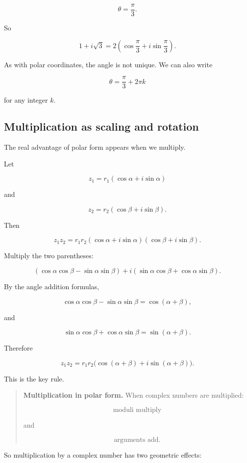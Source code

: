 \[
\theta=\frac{\pi}{3}.
\]

So

\[
\boxed{
1+i\sqrt3
=
2\left(\cos\frac{\pi}{3}+i\sin\frac{\pi}{3}\right).
}
\]

As with polar coordinates, the angle is not unique.  We can also write

\[
\theta=\frac{\pi}{3}+2\pi k
\]

for any integer \(k\).

\subsection{Multiplication as scaling and rotation}
\label{subsec:complex-multiplication-scaling-rotation}

The real advantage of polar form appears when we multiply.

Let

\[
z_1=r_1(\cos\alpha+i\sin\alpha)
\]

and

\[
z_2=r_2(\cos\beta+i\sin\beta).
\]

Then

\[
z_1z_2
=
r_1r_2(\cos\alpha+i\sin\alpha)(\cos\beta+i\sin\beta).
\]

Multiply the two parentheses:

\[
(\cos\alpha\cos\beta-\sin\alpha\sin\beta)
+
i(\sin\alpha\cos\beta+\cos\alpha\sin\beta).
\]

By the angle addition formulas,

\[
\cos\alpha\cos\beta-\sin\alpha\sin\beta=\cos(\alpha+\beta),
\]

and

\[
\sin\alpha\cos\beta+\cos\alpha\sin\beta=\sin(\alpha+\beta).
\]

Therefore

\[
\boxed{
z_1z_2
=
r_1r_2\bigl(\cos(\alpha+\beta)+i\sin(\alpha+\beta)\bigr).
}
\]

This is the key rule.

\begin{quote}
\textbf{Multiplication in polar form.}
When complex numbers are multiplied:

\[
\boxed{
\text{moduli multiply}
}
\]

and

\[
\boxed{
\text{arguments add}.
}
\]
\end{quote}

So multiplication by a complex number has two geometric effects:


